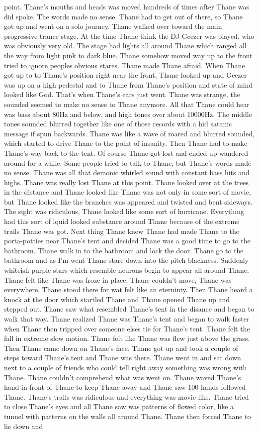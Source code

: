 \documentclass[12pt]{book}
\begin{document}
point. Thane's mouths and heads was moved hundreds of times after Thane was did spoke. The words made no sense. Thane had to get out of there, so Thane got up and went on a solo journey. Thane walked over toward the main progressive trance stage. At the time Thane think the DJ Geezer was played, who was obviously very old. The stage had lights all around Thane which ranged all the way from light pink to dark blue. Thane somehow moved way up to the front tried to ignore peoples obvious stares. Thane made Thane afraid. When Thane got up to to Thane's position right near the front, Thane looked up and Geezer was up on a high pedestal and to Thane from Thane's position and state of mind looked like God. That's when Thane's ears just went. Thane was strange, the sounded seemed to make no sense to Thane anymore. All that Thane could hear was bass about 80Hz and below, and high tones over about 10000Hz. The middle tones sounded blurred together like one of those records with a hid satanic message if spun backwards. Thane was like a wave of roared and blurred sounded, which started to drive Thane to the point of insanity. Then Thane had to make Thane's way back to the tent. Of course Thane got lost and ended up wandered around for a while. Some people tried to talk to Thane, but Thane's words made no sense. Thane was all that demonic whirled sound with constant bass hits and highs. Thane was really lost Thane at this point. Thane looked over at the trees in the distance and Thane looked like Thane was not only in some sort of movie, but Thane looked like the branches was appeared and twisted and bent sideways. The sight was ridiculous, Thane looked like some sort of hurricane. Everything had this sort of lquid looked substance around Thane because of the extreme trails Thane was got. Next thing Thane knew Thane had made Thane to the porta-potties near Thane's tent and decided Thane was a good time to go to the bathroom. Thane walk in to the bathroom and lock the door. Thane go to the bathroom and as I'm went Thane stare down into the pitch blackness. Suddenly whiteish-purple stars which resemble neurons begin to appear all around Thane. Thane felt like Thane was froze in place. Thane couldn't move, Thane was everywhere. Thane stood there for wat felt like an eterninty. Then Thane heard a knock at the door which startled Thane and Thane opened Thane up and stepped out. Thane saw what resembled Thane's tent in the disance and began to walk that way. Thane realized Thane was Thane's tent and began to walk faster when Thane then tripped over someone elses tie for Thane's tent. Thane felt the fall in extreme slow motion. Thane felt like Thane was flew just above the grass. Then Thane came down on Thane's face. Thane got up and took a couple of steps toward Thane's tent and Thane was there. Thane went in and sat down next to a couple of friends who could tell right away something was wrong with Thane. Thane couldn't comprehend what was went on. Thane waved Thane's hand in front of Thane to keep Thane away and Thane saw 100 hands followed Thane. Thane's trails was ridiculous and everything was movie-like. Thane tried to close Thane's eyes and all Thane saw was patterns of flowed color, like a tunnel with patterns on the walls all around Thane. Thane then forced Thane to lie down and 
\end{document}
